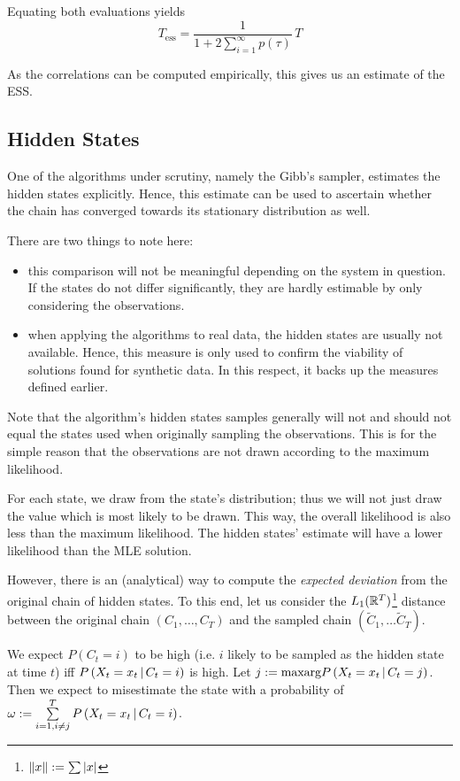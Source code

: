Equating both evaluations yields
\[
	T_{\text{ess}} = \frac{1}{	1 + 2 \sum\limits_{i=1}^\infty p(\tau)} \, T
\]

As the correlations can be computed empirically, this gives us an estimate of the ESS. 


\subsection{Hidden States}
One of the algorithms under scrutiny, namely the Gibb's sampler, estimates the hidden states explicitly. Hence, this estimate can be used to ascertain whether the chain has converged towards its stationary distribution as well.

There are two things to note here:
\begin{itemize}
\item  this comparison will not be meaningful depending on the system in question. \\
 If the states do not differ significantly, they are hardly estimable by only considering the observations.
\item when applying the algorithms to real data, the hidden states are usually not available. Hence, this measure is only used to confirm the viability of solutions found for synthetic data. In this respect, it backs up the measures defined earlier. 
\end{itemize}


Note that the algorithm's hidden states samples generally will not and should not equal the states used when originally sampling the observations. This is for the simple reason that the observations are not drawn according to the maximum likelihood.

 For each state, we draw from the state's distribution; thus we will not just draw the value which is most likely to be drawn. This way, the overall likelihood is also less than the maximum likelihood. The hidden states' estimate will have a lower likelihood than the MLE solution. 

However, there is an (analytical) way to compute the \textit{expected deviation} from the original chain of hidden states. 
To this end, let us consider the $L_1(\mathbb{R}^T)$\footnote{$\left\lVert x\right\rVert := \sum |x|$} distance between the original chain $\left(C_1, \dots, C_T\right)$ and the sampled chain $\left(\tilde{C}_1, \dots \tilde{C}_T\right)$. 

We expect $P(C_t = i)$ to be high (i.e. $i$ likely to be sampled as the hidden state at time $t$) iff $P\left(X_t = x_t \, | \,  C_t = i\right)$ is high. Let $j := \text{maxarg} P\left(X_t = x_t \, | \, C_t = j\right)$. Then we expect to misestimate the state with a probability of $\omega := \sum\limits_{i = 1, i \neq j}^T P\left(X_t = x_t \, | \, C_t = i\right)$. 

